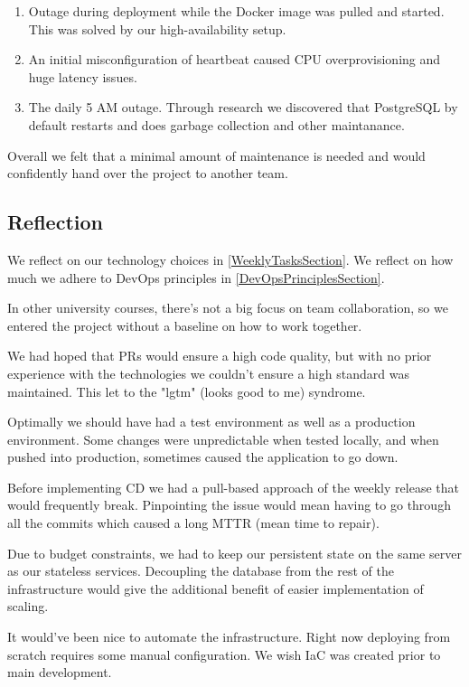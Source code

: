 \documentclass{article}
\begin{document}
\begin{enumerate}
    \item Outage during deployment while the Docker image was pulled and started. This was solved by our high-availability setup. 
    \item An initial misconfiguration of heartbeat caused CPU overprovisioning and huge latency issues.
    \item The daily 5 AM outage. Through research we discovered that PostgreSQL by default restarts and does garbage collection and other maintanance. 
\end{enumerate}

Overall we felt that a minimal amount of maintenance is needed and would confidently hand over the project to another team. 

\subsection{Reflection}

We reflect on our technology choices in \ref{WeeklyTasksSection}.
We reflect on how much we adhere to DevOps principles in \ref{DevOpsPrinciplesSection}.

In other university courses, there's not a big focus on team collaboration, so we entered the project without a baseline on how to work together.

We had hoped that PRs would ensure a high code quality, but with no prior experience with the technologies we couldn't ensure a high standard was maintained. This let to the "lgtm" (looks good to me) syndrome.

Optimally we should have had a test environment as well as a production environment. Some changes were unpredictable when tested locally, and when pushed into production, sometimes caused the application to go down.

Before implementing CD we had a pull-based approach of the weekly release that would frequently break. Pinpointing the issue would mean having to go through all the commits which caused a long MTTR (mean time to repair). 

Due to budget constraints, we had to keep our persistent state on the same server as our stateless services. Decoupling the database from the rest of the infrastructure would give the additional benefit of easier implementation of scaling. 

It would've been nice to automate the infrastructure. Right now deploying from scratch requires some manual configuration. We wish IaC was created prior to main development. 
\end{document}
